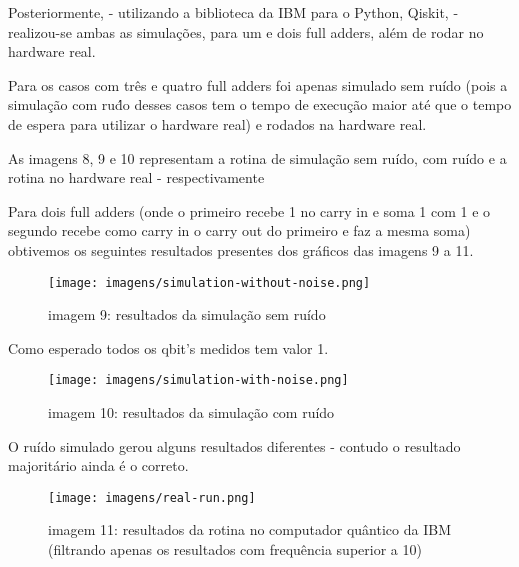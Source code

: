 \documentclass[12pt, a4paper]{article} %
\begin{document}
        Posteriormente, - utilizando a biblioteca da IBM para o Python, Qiskit, - realizou-se ambas as simula\c{c}\~oes, para um e dois full adders, al\'em de rodar no hardware real.
        
        Para os casos com tr\^es e quatro full adders foi apenas simulado sem ru\'ido (pois a simula\c{c}\~ao com ru\'do desses casos tem o tempo de execu\c{c}\~ao maior at\'e que o tempo de espera para utilizar o hardware real) e rodados na hardware real.

        As imagens 8, 9 e 10 representam a rotina de simula\c{c}\~ao sem ru\'ido, com ru\'ido e a rotina no hardware real - respectivamente

        Para dois full adders (onde o primeiro recebe 1 no carry in e soma 1 com 1 e o segundo recebe como carry in o carry out do primeiro e faz a mesma soma) obtivemos os seguintes resultados presentes dos gr\'aficos das imagens 9 a 11.

        \begin{figure}[H]
        
        \centering
        
        \texttt{[image: imagens/simulation-without-noise.png]}
        
        imagem 9: resultados da simula\c{c}\~ao sem ru\'ido
        
        \end{figure}

        Como esperado todos os qbit's medidos tem valor 1.

        \begin{figure}[H]
        
        \centering
        
        \texttt{[image: imagens/simulation-with-noise.png]}
        
        imagem 10: resultados da simula\c{c}\~ao com ru\'ido
        
        \end{figure}

        O ru\'ido simulado gerou alguns resultados diferentes - contudo o resultado majorit\'ario ainda \'e o correto.
        
        \begin{figure}[H]
        
        \centering
        
        \texttt{[image: imagens/real-run.png]}
        
        imagem 11: resultados da rotina no computador qu\^antico da IBM (filtrando apenas os resultados com frequ\^encia superior a 10)
        
        \end{figure}
\end{document}

